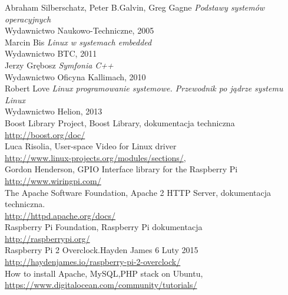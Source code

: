 \begin{thebibliography}{99}
 Abraham Silberschatz, Peter B.Galvin, Greg Gagne {\it Podstawy systemów operacyjnych }\\ Wydawnictwo Naukowo-Techniczne, 2005 \\
 Marcin Bis {\it Linux w systemach embedded }\\ Wydawnictwo BTC, 2011 \\
 Jerzy Grębosz {\it Symfonia C++}\\ Wydawnictwo Oficyna Kallimach, 2010 \\
 Robert Love {\it Linux programowanie systemowe. Przewodnik po jądrze systemu Linux}\\ Wydawnictwo Helion, 2013 \\

 Boost Library Project, Boost Library, dokumentacja techniczna  \\
		\url{http://boost.org/doc/}\\
 Luca Risolia, User-space Video for Linux driver  \\
		\url{http://www.linux-projects.org/modules/sections/}, \\
  Gordon Henderson, GPIO Interface library for the Raspberry Pi\\
		\url{http://www.wiringpi.com/} \\
 The Apache Software Foundation, Apache 2 HTTP Server, dokumentacja techniczna.\\
		\url{http://httpd.apache.org/docs/} \\
Raspberry Pi Foundation, Raspberry Pi dokumentacja  \\
		\url{http://raspberrypi.org/} \\ 
 Raspberry Pi 2 Overclock.Hayden James 6 Luty 2015 \\
		\url{http://haydenjames.io/raspberry-pi-2-overclock/} \\						
							
 How to install Apache, MySQL,PHP stack on Ubuntu, \\
	\url{https://www.digitalocean.com/community/tutorials/} \\ 
	
\end{thebibliography}

